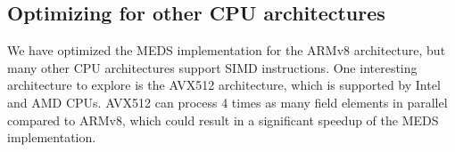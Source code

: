 \documentclass[11pt,a4paper]{report}
\theoremstyle{definition}
\begin{document}
\subsection*{Optimizing for other CPU architectures}
We have optimized the MEDS implementation for the ARMv8 architecture, but many other CPU architectures support SIMD instructions. One interesting architecture to explore is the AVX512 architecture, which is supported by Intel and AMD CPUs. AVX512 can process 4 times as many field elements in parallel compared to ARMv8, which could result in a significant speedup of the MEDS implementation.




\appendix


\end{document}
